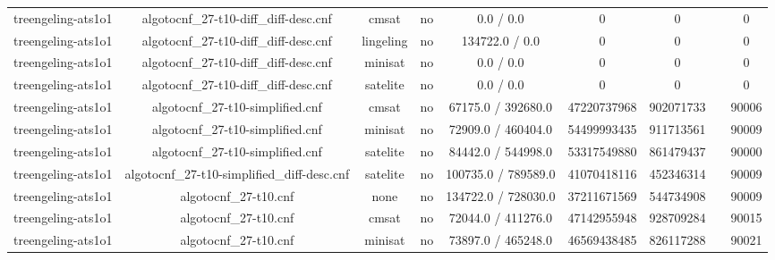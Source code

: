 \begin{appendices}
\begin{table}[p]
\begin{center}
\begin{tabular}{l|cccccccc}
  treengeling-ats1o1             & algotocnf\_27-t10-diff\_diff-desc.cnf & cmsat      & no    & 0.0 / 0.0  & 0         & 0         &            & 0 \\ %
  treengeling-ats1o1             & algotocnf\_27-t10-diff\_diff-desc.cnf & lingeling  & no    & 134722.0 / 0.0 & 0         & 0         &            & 0 \\ %
  treengeling-ats1o1             & algotocnf\_27-t10-diff\_diff-desc.cnf & minisat    & no    & 0.0 / 0.0  & 0         & 0         &            & 0 \\ %
  treengeling-ats1o1             & algotocnf\_27-t10-diff\_diff-desc.cnf & satelite   & no    & 0.0 / 0.0  & 0         & 0         &            & 0 \\ %
  treengeling-ats1o1             & algotocnf\_27-t10-simplified.cnf & cmsat      & no    & 67175.0 / 392680.0 & 47220737968 & 902071733 &            & 90006 \\ %
  treengeling-ats1o1             & algotocnf\_27-t10-simplified.cnf & minisat    & no    & 72909.0 / 460404.0 & 54499993435 & 911713561 &            & 90009 \\ %
  treengeling-ats1o1             & algotocnf\_27-t10-simplified.cnf & satelite   & no    & 84442.0 / 544998.0 & 53317549880 & 861479437 &            & 90000 \\ %
  treengeling-ats1o1             & algotocnf\_27-t10-simplified\_diff-desc.cnf & satelite   & no    & 100735.0 / 789589.0 & 41070418116 & 452346314 &            & 90009 \\ %
  treengeling-ats1o1             & algotocnf\_27-t10.cnf          & none       & no    & 134722.0 / 728030.0 & 37211671569 & 544734908 &            & 90009 \\ %
  treengeling-ats1o1             & algotocnf\_27-t10.cnf          & cmsat      & no    & 72044.0 / 411276.0 & 47142955948 & 928709284 &            & 90015 \\ %
  treengeling-ats1o1             & algotocnf\_27-t10.cnf          & minisat    & no    & 73897.0 / 465248.0 & 46569438485 & 826117288 &            & 90021 \\ %

\end{tabular}
\end{center}
\end{table}
\end{appendices}
